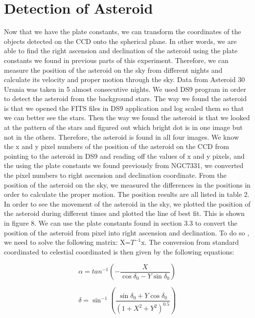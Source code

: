 \documentclass[letterpaper,12pt]{article}
\begin{document}
\section{Detection of Asteroid}
\label{sec:detectionofasteroid}
Now that we have the plate constants, we can transform the coordinates of the objects detected on the CCD onto the spherical plane. In other words, we are able to find the right ascension and declination of the asteroid using the plate constants we found in previous parts of this experiment. Therefore, we can measure the position of the asteroid on the sky from different nights and calculate its velocity and proper motion through the sky. Data from Asteroid 30 Urania was taken in 5 almost consecutive nights. We used DS9 program in order to detect the asteroid from the background stars. The way we found the asteroid is that we opened the FITS files in DS9 application and log scaled them so that we can better see the stars. Then the way we found the asteroid is that we looked at the pattern of the stars and figured out which bright dot is in one image but not in the others. Therefore, the asteroid is found in all four images. We know the x and y pixel numbers of the position of the asteroid on the CCD from pointing to the asteroid in DS9 and reading off the values of x and y pixels, and the using the plate constants we found previously from NGC7331, we converted the pixel numbers to right ascension and declination coordinate. From the position of the asteroid on the sky, we measured the differences in the positions in order to calculate the proper motion. The position results are all listed in table 2.
In order to see the movement of the asteroid in the sky, we plotted the position of the asteroid during different times and plotted the line of best fit. This is shown in figure 8. We can use the plate constants found in section 3.3 to convert the position of the asteroid from pixel into right ascension and declination. To do so , we need to solve the following matrix:
X=\begin{math}T^{-1}\end{math}x.
The conversion from standard coordinated to celestial coordinated is then given by the following equations:

\begin{equation}
\alpha = tan^{-1}(-\frac{X}{\cos\delta_{0} - Y\sin\delta_{0}})
\end{equation}

\begin{equation}
\delta = \sin^{-1}(\frac{\sin\delta_{0} + Y\cos\delta_{0}}{(1+X^2+Y^2)^{0.5}})
\end{equation}
\end{document}
